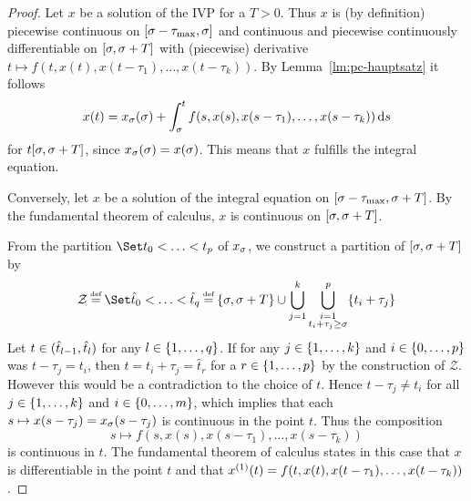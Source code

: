     \begin{proof}
        Let $x$ be a solution of the IVP for a $T>0$. Thus $x$ is (by definition) piecewise continuous on $\compactum{\tzero-\taumax}{\tzero}$ and continuous and piecewise continuously differentiable on $\compactum{\tzero}{\tzero+T}$ with (piecewise) derivative $t\mapsto f(t,x(t),x(t-\tau_1),\ldots,x(t-\tau_k))$.
        By Lemma~\ref{lm:pc-hauptsatz} it follows
        \begin{equation*}
            x(t) = x_{\tzero}(\tzero) + \integral{\tzero}{t} f(s,x(s),x(s-\tau_1),\ldots,x(s-\tau_k))\dx[s]
        \end{equation*}
        for $t\compactum{\tzero}{\tzero+T}$, since $x_{\tzero}(\tzero)=x(\tzero)$. This means that $x$ fulfills the integral equation.

        Conversely, let $x$ be a solution of the integral equation on $\compactum{\tzero-\taumax}{\tzero+T}$.
        By the fundamental theorem of calculus, $x$ is continuous on $\compactum{\tzero}{\tzero+T}$.

        From the partition $\partition{t_0}{t_p}$ of $x_{\tzero}$, we construct a partition of $\compactum{\tzero}{\tzero+T}$ by
        \begin{equation}\label{eq:partition}
            \mathcal{Z}\defeq \partition{\hat{t}_0}{\hat{t}_q}
            \defeq \set{\tzero,\tzero+T}\cup\bigcup_{j=1}^{k}\bigcup_{\substack{i=1\\t_i+\tau_j\geq\tzero}}^{p}\set{t_i+\tau_j}
        \end{equation}
        Let $t\in\open{\hat{t}_{l-1}}{\hat{t}_l}$ for any $l\in\set{\range{1}{q}}$. If for any $j\in\set{\range{1}{k}}$ and $i\in\set{\range{0}{p}}$ was $t-\tau_j = t_i$, then $t=t_i+\tau_j=\hat{t}_r$ for a $r\in\set{\range{1}{p}}$ by the construction of $\mathcal{Z}$. However this would be a contradiction to the choice of $t$. Hence $t-\tau_j \neq t_i$ for all $j\in\set{\range{1}{k}}$ and $i\in\set{\range{0}{m}}$, which implies that each $s\mapsto x(s-\tau_j)=x_{\tzero}(s-\tau_j)$ is continuous in the point $t$. Thus the composition
        \begin{equation*}
            s\mapsto f(s,x(s),x(s-\tau_1),\ldots,x(s-\tau_k))
        \end{equation*}
        is continuous in $t$. The fundamental theorem of calculus states in this case that $x$ is differentiable in the point $t$ and that $\D{x}(t)=f(t,x(t),x(t-\tau_1),\ldots,x(t-\tau_k))$.


\end{proof}
